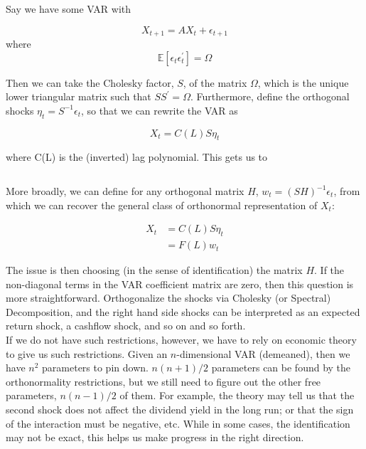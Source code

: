 \documentclass[11pt,letter]{article}
\begin{document}
Say we have some VAR with

$$
X_{t+1}  = AX_t + \epsilon_{t+1}
$$
where 
$$
\mathbb{E} [\epsilon_t \epsilon_t^{\prime}]  = \Omega
$$

Then we can take the Cholesky factor, $S$, of the matrix
$\Omega$, which is the unique lower triangular matrix such that
$SS^\prime = \Omega $. Furthermore, define the orthogonal shocks
$\eta_t = S^{-1}\epsilon_t$, so that we can rewrite the VAR as

$$
X_t = C(L)S\eta_t
$$

where C(L) is the (inverted) lag polynomial. This gets us to

\begin{equation*}
\end{equation*}

More broadly, we can define for any orthogonal matrix $H$,
$w_t = (SH)^{-1}\epsilon_t$, from which we can recover
the general class of orthonormal representation of $X_t$:

\begin{equation*}
\begin{split}
X_t & = C(L)S\eta_t \\
& = F(L) w_t
\end{split}
\end{equation*}

The issue is then choosing (in the sense of identification) the
matrix $H$. If the non-diagonal terms in the VAR coefficient matrix
are zero, then this question is more straightforward. Orthogonalize
the shocks via Cholesky (or Spectral) Decomposition, and the
right hand side shocks can be interpreted as an
expected return shock, a cashflow shock, and so on and so forth. \\

If we do not have such restrictions, however, we have to rely on
economic theory to give us such restrictions. Given an $n$-dimensional
VAR (demeaned), then we have $n^2$ parameters to pin down.
$n(n+1)/2$ parameters can be found by the orthonormality
restrictions, but we still need to figure out the other
free parameters, $n(n-1)/2$ of them. For example,
the theory may tell us that the second shock does not affect
the dividend yield in the long run; or that the sign of
the interaction must be negative, etc. While in some cases,
the identification may not be exact, this helps us make progress
in the right direction.
\end{document}
